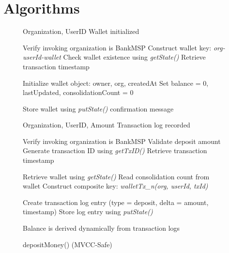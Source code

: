 \documentclass[12pt]{article}
\begin{document}
	
	\appendix
	
	\section{Algorithms}
	
		\begin{figure}[h]
		\centering
		\caption{Wallet Creation and MVCC-Safe Deposit Mechanisms}
		\label{fig:create_deposit}
		
		\begin{minipage}[t]{0.48\linewidth}
			\vspace{0pt}
			\centering
			\begin{algorithm}[H]
				\caption{createWallet()}
				\begin{algorithmic}[1]
					
					\Require Organization, UserID
					\Ensure Wallet initialized
					
					\State Verify invoking organization is BankMSP
					\State Construct wallet key: \textit{org-userId-wallet}
					\State Check wallet existence using \textit{getState()}
					\State Retrieve transaction timestamp
					
					\State Initialize wallet object: owner, org, createdAt
					\State Set balance = 0, lastUpdated, consolidationCount = 0
					
					\State Store wallet using \textit{putState()}
					\State \Return confirmation message
					
				\end{algorithmic}
			\end{algorithm}
		\end{minipage}
		\hfill
		\begin{minipage}[t]{0.48\linewidth}
			\vspace{0pt}
			\centering
			\begin{algorithm}[H]
				\caption{depositMoney() (MVCC-Safe)}
				\begin{algorithmic}[1]
					
					\Require Organization, UserID, Amount
					\Ensure Transaction log recorded
					
					\State Verify invoking organization is BankMSP
					\State Validate deposit amount
					\State Generate transaction ID using \textit{getTxID()}
					\State Retrieve transaction timestamp
					
					\State Retrieve wallet using \textit{getState()}
					\State Read consolidation count from wallet
					\State Construct composite key: \textit{walletTx\_n(org, userId, txId)}
					
					\State Create transaction log entry (type = deposit, delta = amount, timestamp)
					\State Store log entry using \textit{putState()}
					
					\State Balance is derived dynamically from transaction logs
					
				\end{algorithmic}
			\end{algorithm}
		\end{minipage}
		
	\end{figure}
	
\end{document}
